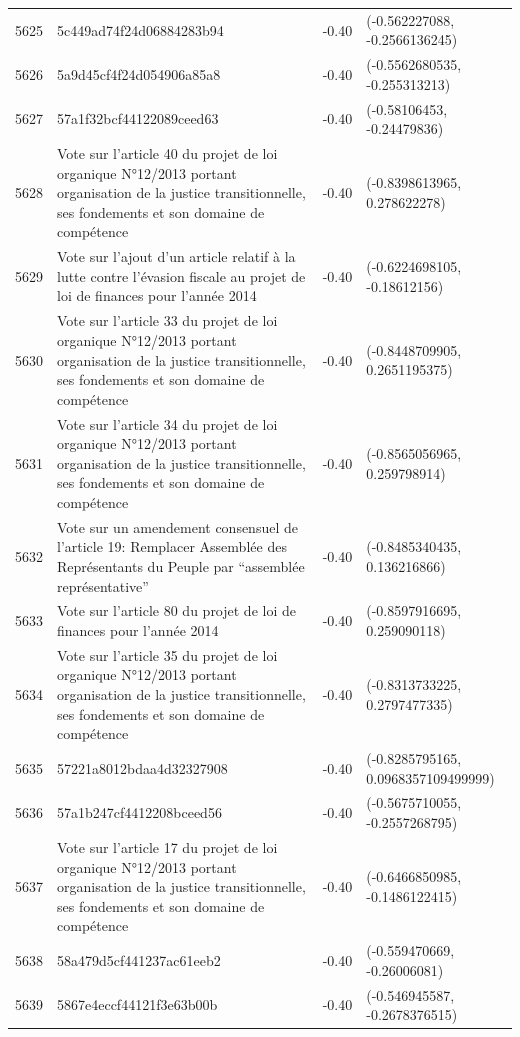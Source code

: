 \begin{table}[ht]
\begin{tabular}{rlrl}
  5625 & 5c449ad74f24d06884283b94 & -0.40 & (-0.562227088, -0.2566136245) \\ 
  5626 & 5a9d45cf4f24d054906a85a8 & -0.40 & (-0.5562680535, -0.255313213) \\ 
  5627 & 57a1f32bcf44122089ceed63 & -0.40 & (-0.58106453, -0.24479836) \\ 
  5628 & Vote sur l'article 40 du projet de loi organique N°12/2013 portant organisation de la justice transitionnelle, ses fondements et son domaine de compétence & -0.40 & (-0.8398613965, 0.278622278) \\ 
  5629 & Vote sur l'ajout d'un article relatif à la lutte contre l'évasion fiscale au projet de loi de finances pour l'année 2014 & -0.40 & (-0.6224698105, -0.18612156) \\ 
  5630 & Vote sur l'article 33 du projet de loi organique N°12/2013 portant organisation de la justice transitionnelle, ses fondements et son domaine de compétence & -0.40 & (-0.8448709905, 0.2651195375) \\ 
  5631 & Vote sur l'article 34 du projet de loi organique N°12/2013 portant organisation de la justice transitionnelle, ses fondements et son domaine de compétence & -0.40 & (-0.8565056965, 0.259798914) \\ 
  5632 & Vote sur un amendement consensuel de l'article 19: Remplacer Assemblée des Représentants du Peuple par “assemblée représentative” & -0.40 & (-0.8485340435, 0.136216866) \\ 
  5633 & Vote sur l'article 80 du projet de loi de finances pour l'année 2014 & -0.40 & (-0.8597916695, 0.259090118) \\ 
  5634 & Vote sur l'article 35 du projet de loi organique N°12/2013 portant organisation de la justice transitionnelle, ses fondements et son domaine de compétence & -0.40 & (-0.8313733225, 0.2797477335) \\ 
  5635 & 57221a8012bdaa4d32327908 & -0.40 & (-0.8285795165, 0.0968357109499999) \\ 
  5636 & 57a1b247cf4412208bceed56 & -0.40 & (-0.5675710055, -0.2557268795) \\ 
  5637 & Vote sur l'article 17 du projet de loi organique N°12/2013 portant organisation de la justice transitionnelle, ses fondements et son domaine de compétence & -0.40 & (-0.6466850985, -0.1486122415) \\ 
  5638 & 58a479d5cf441237ac61eeb2 & -0.40 & (-0.559470669, -0.26006081) \\ 
  5639 & 5867e4eccf44121f3e63b00b & -0.40 & (-0.546945587, -0.2678376515) \\ 

\end{tabular}
\end{table}
